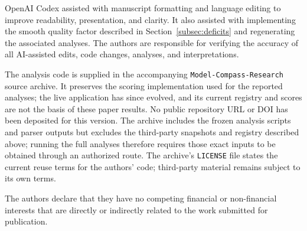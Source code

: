 \documentclass[pdflatex,sn-mathphys-num]{sn-jnl}
\theoremstyle{thmstyleone}
\theoremstyle{thmstylethree}
\begin{document}
OpenAI Codex assisted with manuscript formatting and language editing to improve readability, presentation, and clarity. It also assisted with implementing the smooth quality factor described in Section~\ref{subsec:deficits} and regenerating the associated analyses. The authors are responsible for verifying the accuracy of all AI-assisted edits, code changes, analyses, and interpretations.

The analysis code is supplied in the accompanying \texttt{Model-Compass-Research} source archive. It preserves the scoring implementation used for the reported analyses; the live application has since evolved, and its current registry and scores are not the basis of these paper results. No public repository URL or DOI has been deposited for this version. The archive includes the frozen analysis scripts and parser outputs but excludes the third-party snapshots and registry described above; running the full analyses therefore requires those exact inputs to be obtained through an authorized route. The archive's \texttt{LICENSE} file states the current reuse terms for the authors' code; third-party material remains subject to its own terms.

The authors declare that they have no competing financial or non-financial interests that are directly or indirectly related to the work submitted for publication.

\clearpage
\FloatBarrier



\clearpage
\FloatBarrier
\end{document}
